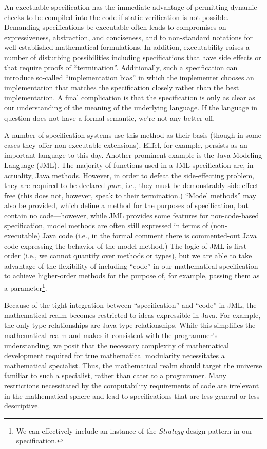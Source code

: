 An exectuable specification has the immediate advantage of permitting dynamic checks to be compiled into the code if static verification is not possible.  Demanding specifications be executable often leads to compromises on expressiveness, abstraction, and conciseness, and to non-standard notations for well-established mathematical formulations.  In addition, executability raises a number of disturbing possibilities including specifications that have side effects or that require proofs of ``termination''.  Additionally, such a specification can introduce so-called ``implementation bias'' in which the implementer chooses an implementation that matches the specification closely rather than the best implementation.  A final complication is that the specification is only as clear as our understanding of the meaning of the underlying language.  If the language in question does not have a formal semantic, we're not any better off.

A number of specification systems use this method as their basis (though in some cases they offer non-executable extensions).  Eiffel, for example, persists as an important language to this day.  Another prominent example is the Java Modeling Language (JML)\cite{leavensJML}.  The majority of functions used in a JML specification are, in actuality, Java methods.  However, in order to defeat the side-effecting problem, they are required to be declared \emph{pure}, i.e., they must be demonstrably side-effect free (this does not, however, speak to their termination.)  ``Model methods'' may also be provided, which define a method for the purposes of specification, but contain no code---however, while JML provides some features for non-code-based specification, model methods are often still expressed in terms of (non-executable) Java code (i.e., in the formal comment there is commented-out Java code expressing the behavior of the model method.)  The logic of JML is first-order (i.e., we cannot quantify over methods or types), but we are able to take advantage of the flexibility of including ``code'' in our mathematical specification to achieve higher-order methods for the purpose of, for example, passing them as a parameter\footnote{We can effectively include an instance of the \emph{Strategy} design pattern in our specification.}.

Because of the tight integration between ``specification'' and ``code'' in JML, the mathematical realm becomes restricted to ideas expressible in Java.  For example, the only type-relationships are Java type-relationships.  While this simplifies the mathematical realm and makes it consistent with the programmer's understanding, we posit that the necessary complexity of mathematical development required for true mathematical modularity necessitates a mathematical specialist.  Thus, the mathematical realm should target the universe familiar to such a specialist, rather than cater to a programmer.  Many restrictions necessitated by the computability requirements of code are irrelevant in the mathematical sphere and lead to specifications that are less general or less descriptive.

